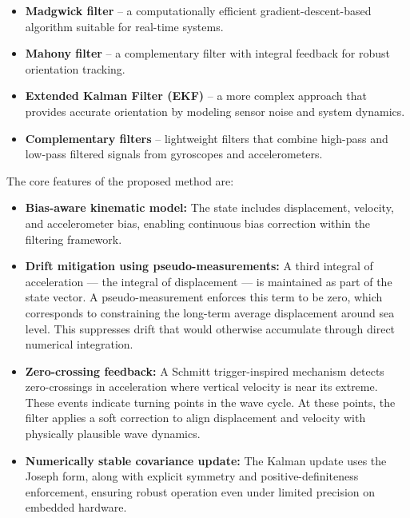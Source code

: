\documentclass[11pt,letterpaper]{article}
\begin{document}
\begin{itemize}
\item \textbf{Madgwick\cite{madgwick2010efficient} filter} – a computationally efficient gradient-descent-based algorithm suitable for real-time systems.
\item \textbf{Mahony\cite{mahony2008nonlinear} filter} – a complementary filter with integral feedback for robust orientation tracking.
\item \textbf{Extended Kalman Filter (EKF)\cite{Markley2003,Lefferts1982}} – a more complex approach that provides accurate orientation by modeling sensor noise and system dynamics.
\item \textbf{Complementary filters} – lightweight filters that combine high-pass and low-pass filtered signals from gyroscopes and accelerometers.
\end{itemize}

The core features of the proposed method are:

\begin{itemize}
    \item \textbf{Bias-aware kinematic model:} The state includes displacement, velocity, and accelerometer bias, enabling continuous bias correction within the filtering framework.
    
    \item \textbf{Drift mitigation using pseudo-measurements:} A third integral of acceleration --- the integral of displacement --- is maintained as part of the state vector. A pseudo-measurement enforces this term to be zero, which corresponds to constraining the long-term average displacement around sea level. This suppresses drift that would otherwise accumulate through direct numerical integration.
    
    \item \textbf{Zero-crossing feedback:} A Schmitt trigger-inspired mechanism detects zero-crossings in acceleration where vertical velocity is near its extreme. These events indicate turning points in the wave cycle. At these points, the filter applies a soft correction to align displacement and velocity with physically plausible wave dynamics.
    
    \item \textbf{Numerically stable covariance update:} The Kalman update uses the Joseph form, along with explicit symmetry and positive-definiteness enforcement, ensuring robust operation even under limited precision on embedded hardware.
\end{itemize}
\end{document}
